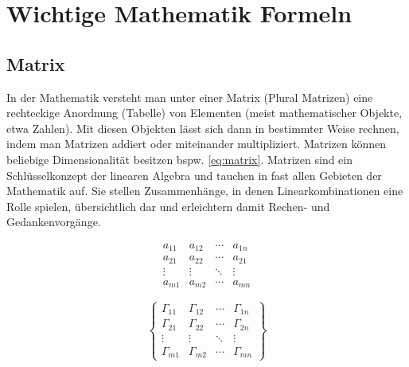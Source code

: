 \chapter{Wichtige Mathematik Formeln}
\label{cha:wichtige_mathematik_formeln}


\section{Matrix}
\label{sec:matrix}
In der Mathematik versteht man unter einer Matrix (Plural Matrizen) eine rechteckige Anordnung (Tabelle) von Elementen (meist mathematischer Objekte, etwa Zahlen). Mit diesen Objekten lässt sich dann in bestimmter Weise rechnen, indem man Matrizen addiert oder miteinander multipliziert. Matrizen können beliebige Dimensionalität besitzen bspw. \ref{eq:matrix}.
\vspace{5mm}
Matrizen sind ein Schlüsselkonzept der linearen Algebra und tauchen in fast allen Gebieten der Mathematik auf. Sie stellen Zusammenhänge, in denen Linearkombinationen eine Rolle spielen, übersichtlich dar und erleichtern damit Rechen- und Gedankenvorgänge.
\vspace{5mm}

\[ \begin{array}{|cccc|} \label{eq:matrix}
a_{11} & a_{12} & \cdots & a_{1n} \\
a_{21} & a_{22} & \cdots & a_{21} \\
\vdots & \vdots & \ddots & \vdots \\
a_{m1} & a_{m2} & \cdots & a_{mn}
\end{array} \]

\begin{displaymath}
\left\{\begin{array}{cccc}
\Gamma_{11} & \Gamma_{12} & \cdots &
\Gamma_{1n}\\
\Gamma_{21} & \Gamma_{22} & \cdots &
\Gamma_{2n}\\
\vdots & \vdots & \ddots &
\vdots\\
\Gamma_{m1} & \Gamma_{m2} & \cdots &
\Gamma_{mn}
\end{array}\right\}
\end{displaymath}


